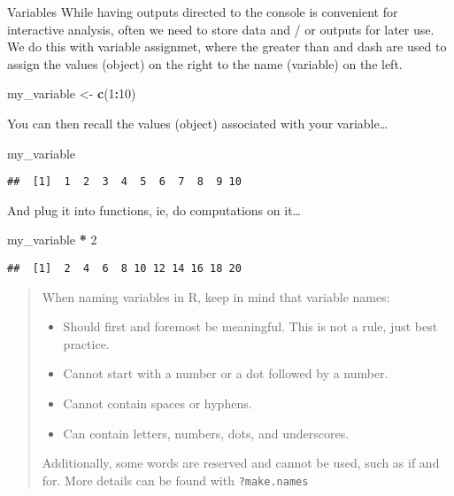 \documentclass[
  ignorenonframetext,
]{beamer}
\newenvironment{Shaded}{\begin{snugshade}}{\end{snugshade}}
\newcommand{\DecValTok}[1]{\textcolor[rgb]{0.00,0.00,0.81}{#1}}
\newcommand{\FunctionTok}[1]{\textcolor[rgb]{0.13,0.29,0.53}{\textbf{#1}}}
\newcommand{\NormalTok}[1]{#1}
\newcommand{\OtherTok}[1]{\textcolor[rgb]{0.56,0.35,0.01}{#1}}
\newcommand{\SpecialCharTok}[1]{\textcolor[rgb]{0.81,0.36,0.00}{\textbf{#1}}}
\providecommand{\tightlist}{%
  \setlength{\itemsep}{0pt}\setlength{\parskip}{0pt}}
\begin{document}
\begin{frame}[fragile]{Variables}
\protect\hypertarget{variables}{}
While having outputs directed to the console is convenient for
interactive analysis, often we need to store data and / or outputs for
later use. We do this with variable assignmet, where the greater than
and dash are used to assign the values (object) on the right to the name
(variable) on the left.

\begin{Shaded}
\begin{Highlighting}[]
\NormalTok{my\_variable }\OtherTok{\textless{}{-}} \FunctionTok{c}\NormalTok{(}\DecValTok{1}\SpecialCharTok{:}\DecValTok{10}\NormalTok{)}
\end{Highlighting}
\end{Shaded}

You can then recall the values (object) associated with your
variable\ldots{}

\begin{Shaded}
\begin{Highlighting}[]
\NormalTok{my\_variable}
\end{Highlighting}
\end{Shaded}

\begin{verbatim}
##  [1]  1  2  3  4  5  6  7  8  9 10
\end{verbatim}

And plug it into functions, ie, do computations on it\ldots{}

\begin{Shaded}
\begin{Highlighting}[]
\NormalTok{my\_variable }\SpecialCharTok{*} \DecValTok{2}
\end{Highlighting}
\end{Shaded}

\begin{verbatim}
##  [1]  2  4  6  8 10 12 14 16 18 20
\end{verbatim}

\begin{quote}
When naming variables in R, keep in mind that variable names:

\begin{itemize}
\tightlist
\item
  Should first and foremost be meaningful. This is not a rule, just best
  practice.
\item
  Cannot start with a number or a dot followed by a number.
\item
  Cannot contain spaces or hyphens.
\item
  Can contain letters, numbers, dots, and underscores.
\end{itemize}

Additionally, some words are reserved and cannot be used, such as if and
for. More details can be found with \texttt{?make.names}
\end{quote}
\end{frame}
\end{document}
